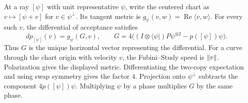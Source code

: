 \begin{lemma}\label{lem:acceptance-gradient}
  \leanok
  \par
  At a ray $[\psi]$ with unit representative $\psi$, write the centered
  chart as $v\mapsto[\psi+v]$ for $v\in\psi^\perp$. Its tangent metric
  is $g_\psi(v,w)=\operatorname{Re}\langle v,w\rangle$. For every such $v$,
  the differential of acceptance satisfies
  \[
    dp_{[\psi]}(v)=g_\psi(G,v),\qquad
    G=4\big((I\otimes\langle\psi|)P\psi^{\otimes 2}-p([\psi])\psi\big).
  \]
  Thus $G$ is the unique horizontal vector representing the differential.
  For a curve through the chart origin with velocity $v$, the
  Fubini--Study speed is $\lVert v \rVert$. Polarization gives the displayed metric. Differentiating
  the two-copy expectation and using swap symmetry gives the factor $4$.
  Projection onto $\psi^\perp$ subtracts the component $4p([\psi])\psi$.
  Multiplying $\psi$ by a phase multiplies $G$ by the same phase.
\end{lemma}

